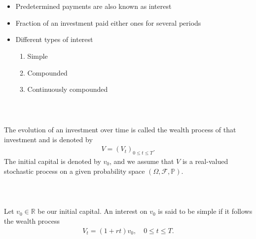 \documentclass{beamer}
\numberwithin{equation}{section}
\begin{document}
\begin{frame}\frametitle{{\normalsize \secname} \\ {\large \subsecname}}
    \begin{itemize}
        \item Predetermined payments are also known as interest
        \item Fraction of an investment paid either ones for several periods
        \item Different types of interest
        \begin{enumerate}
            \item Simple
            \item Compounded
            \item Continuously compounded
        \end{enumerate}
    \end{itemize}
\end{frame}

\begin{frame}\frametitle{{\normalsize \secname} \\ {\large \subsecname}}
    \begin{definition}
        The evolution of an investment over time is called the wealth process of that investment and is denoted by
        \begin{align}
            V = (V_t)_{0 \leq t \leq T}.
        \end{align}
        The initial capital is denoted by $v_0$, and we assume that $V$ is a real-valued stochastic process on a given probability space $(\Omega, \mathscr{F}, \mathbb{P})$.
    \end{definition}
\end{frame}

\begin{frame}\frametitle{{\normalsize \secname} \\ {\large \subsecname}}
    \begin{definition}
        Let $v_0 \in \mathbb{R}$ be our initial capital.
        An interest on $v_0$ is said to be simple if it follows the wealth process
        \begin{align}\label{eq:simple_interest_wealth_process}
            V_t = (1 + rt)v_0, \quad 0 \leq t \leq T.
        \end{align}
    \end{definition}
\end{frame}
\end{document}
